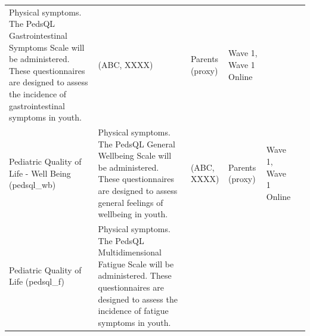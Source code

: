 \documentclass[]{book}
\begin{document}
\begin{longtable}[]{@{}llllll@{}}
\begin{minipage}[t]{0.18\columnwidth}
Physical symptoms. The PedsQL Gastrointestinal Symptoms Scale will be administered. These questionnaires are designed to assess the incidence of gastrointestinal symptoms in youth.\strut
\end{minipage} & \begin{minipage}[t]{0.15\columnwidth}\raggedright
(ABC, XXXX)\strut
\end{minipage} & \begin{minipage}[t]{0.16\columnwidth}\raggedright
Parents (proxy)\strut
\end{minipage} & \begin{minipage}[t]{0.06\columnwidth}\raggedright
Wave 1, Wave 1 Online\strut
\end{minipage} & \begin{minipage}[t]{0.10\columnwidth}\raggedright
\strut
\end{minipage}\tabularnewline
\begin{minipage}[t]{0.18\columnwidth}\raggedright
Pediatric Quality of Life - Well Being (pedsql\_wb)\strut
\end{minipage} & \begin{minipage}[t]{0.18\columnwidth}\raggedright
Physical symptoms. The PedsQL General Wellbeing Scale will be administered. These questionnaires are designed to assess general feelings of wellbeing in youth.\strut
\end{minipage} & \begin{minipage}[t]{0.15\columnwidth}\raggedright
(ABC, XXXX)\strut
\end{minipage} & \begin{minipage}[t]{0.16\columnwidth}\raggedright
Parents (proxy)\strut
\end{minipage} & \begin{minipage}[t]{0.06\columnwidth}\raggedright
Wave 1, Wave 1 Online\strut
\end{minipage} & \begin{minipage}[t]{0.10\columnwidth}\raggedright
\strut
\end{minipage}\tabularnewline
\begin{minipage}[t]{0.18\columnwidth}\raggedright
Pediatric Quality of Life (pedsql\_f)\strut
\end{minipage} & \begin{minipage}[t]{0.18\columnwidth}\raggedright
Physical symptoms. The PedsQL Multidimensional Fatigue Scale will be administered. These questionnaires are designed to assess the incidence of fatigue symptoms in youth.\strut
\end{minipage} & \begin{minipage}[t]{0.15\columnwidth}\raggedright

\end{minipage}
\end{longtable}
\end{document}
